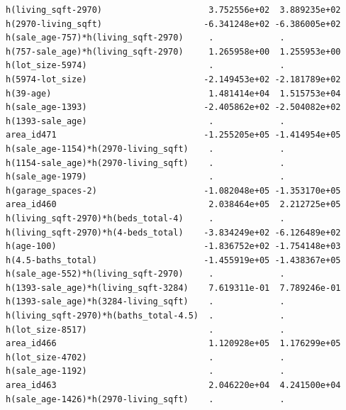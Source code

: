 \documentclass[
]{article}
\begin{document}
\begin{verbatim}
h(living_sqft-2970)                     3.752556e+02  3.889235e+02
h(2970-living_sqft)                    -6.341248e+02 -6.386005e+02
h(sale_age-757)*h(living_sqft-2970)     .             .           
h(757-sale_age)*h(living_sqft-2970)     1.265958e+00  1.255953e+00
h(lot_size-5974)                        .             .           
h(5974-lot_size)                       -2.149453e+02 -2.181789e+02
h(39-age)                               1.481414e+04  1.515753e+04
h(sale_age-1393)                       -2.405862e+02 -2.504082e+02
h(1393-sale_age)                        .             .           
area_id471                             -1.255205e+05 -1.414954e+05
h(sale_age-1154)*h(2970-living_sqft)    .             .           
h(1154-sale_age)*h(2970-living_sqft)    .             .           
h(sale_age-1979)                        .             .           
h(garage_spaces-2)                     -1.082048e+05 -1.353170e+05
area_id460                              2.038464e+05  2.212725e+05
h(living_sqft-2970)*h(beds_total-4)     .             .           
h(living_sqft-2970)*h(4-beds_total)    -3.834249e+02 -6.126489e+02
h(age-100)                             -1.836752e+02 -1.754148e+03
h(4.5-baths_total)                     -1.455919e+05 -1.438367e+05
h(sale_age-552)*h(living_sqft-2970)     .             .           
h(1393-sale_age)*h(living_sqft-3284)    7.619311e-01  7.789246e-01
h(1393-sale_age)*h(3284-living_sqft)    .             .           
h(living_sqft-2970)*h(baths_total-4.5)  .             .           
h(lot_size-8517)                        .             .           
area_id466                              1.120928e+05  1.176299e+05
h(lot_size-4702)                        .             .           
h(sale_age-1192)                        .             .           
area_id463                              2.046220e+04  4.241500e+04
h(sale_age-1426)*h(2970-living_sqft)    .             .           
                                                                  

\end{verbatim}
\end{document}
